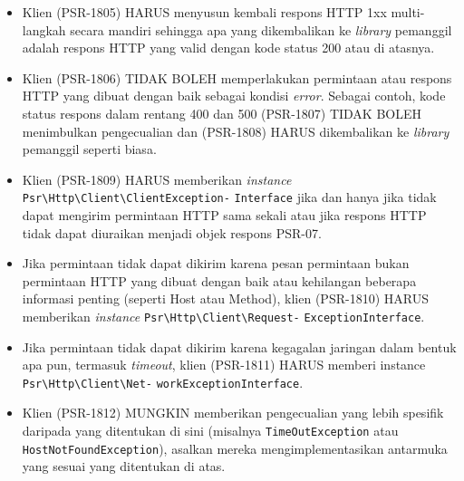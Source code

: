 \documentclass[a4paper,twoside]{article}
\begin{document}
\begin{enumerate}
\begin{enumerate}
\begin{itemize}
\begin{itemize}
					\item Klien (PSR-1805) HARUS menyusun kembali respons HTTP 1xx multi-langkah secara mandiri sehingga apa yang dikembalikan ke \textit{library} pemanggil adalah respons HTTP yang valid dengan kode status 200 atau di atasnya.
					
					\item Klien (PSR-1806) TIDAK BOLEH memperlakukan permintaan atau respons HTTP yang dibuat dengan baik sebagai kondisi \textit{error}. Sebagai contoh, kode status respons dalam rentang 400 dan 500 (PSR-1807) TIDAK BOLEH menimbulkan pengecualian dan (PSR-1808) HARUS dikembalikan ke \textit{library} pemanggil seperti biasa.
					\item Klien (PSR-1809) HARUS memberikan \textit{instance} \texttt{Psr\textbackslash Http\textbackslash Client\textbackslash ClientException-} \texttt{Interface} jika dan hanya jika tidak dapat mengirim permintaan HTTP sama sekali atau jika respons HTTP tidak dapat diuraikan menjadi objek respons PSR-07.
					\item Jika permintaan tidak dapat dikirim karena pesan permintaan bukan permintaan HTTP yang dibuat dengan baik atau kehilangan beberapa informasi penting (seperti Host atau Method), klien (PSR-1810) HARUS memberikan \textit{instance} \texttt{Psr\textbackslash Http\textbackslash Client\textbackslash Request-} \texttt{ExceptionInterface}.
					\item Jika permintaan tidak dapat dikirim karena kegagalan jaringan dalam bentuk apa pun, termasuk \textit{timeout}, klien (PSR-1811) HARUS memberi instance \texttt{Psr\textbackslash Http\textbackslash Client\textbackslash Net-} \texttt{workExceptionInterface}.
					\item Klien (PSR-1812) MUNGKIN memberikan pengecualian yang lebih spesifik daripada yang ditentukan di sini (misalnya \verb|TimeOutException| atau \verb|HostNotFoundException|), asalkan mereka mengimplementasikan antarmuka yang sesuai yang ditentukan di atas.
				\end{itemize}
				

\end{itemize}
\end{enumerate}
\end{enumerate}
\end{document}
